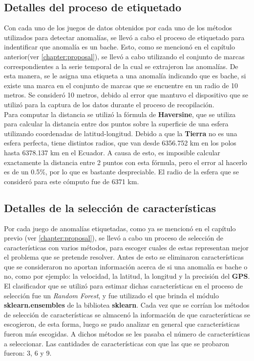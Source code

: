 	\subsection{Detalles del proceso de etiquetado}
		Con cada uno de los juegos de datos obtenidos por cada uno de los métodos utilizados para detectar anomalías, se llevó a cabo
		el proceso de etiquetado para indentificar que anomalía es un bache. Esto, como se mencionó en el capítulo anterior(ver \ref{chapter:proposal}),
		se llevó a cabo utilizando el conjunto de marcas correspondientes a la serie temporal de la cual se extrajeron las anomalías. De esta manera, se
		le asigna una etiqueta a una anomalía indicando que es bache, si existe una marca en el conjunto de marcas que se encuentre en un radio de 10
		metros. Se consideró 10 metros, debido al error que mantuvo el dispositivo que se utilizó para la captura de los datos durante el proceso de
		recopilación.\\
		\indent Para computar la distancia se utilizó la fórmula de \textbf{Haversine}, que se utiliza para calcular la distancia entre dos puntos sobre la
		superficie de una esfera utilizando coordenadas de latitud-longitud. Debido a que la \textbf{Tierra} no es una esfera perfecta, tiene distintos radios, que
		van desde 6356.752 km en los polos hasta 6378.137 km en el Ecuador. A causa de esto, es imposible calcular exactamente la distancia entre 2 puntos
		con esta fórmula, pero el error al hacerlo es de un 0.5\%, por lo que es bastante despreciable. El radio de la esfera que se consideró para este
		cómputo fue de 6371 km.\\

	\subsection{Detalles de la selección de características}
		Por cada juego de anomalías etiquetadas, como ya se mencionó en el capítulo previo (ver \ref{chapter:proposal}), se llevó a cabo un proceso
		de selección de características con varios métodos, para escoger cuales de estas representan mejor el problema que se pretende resolver.
		Antes de esto se eliminaron características que se consideraron no aportan información acerca de si una anomalía es bache o no, como por ejemplo:
		la velocidad, la latitud, la longitud y la precisión del \textbf{GPS}.\\
		\indent El clasificador que se utilizó para estimar dichas características en el proceso de selección fue un \emph{Random Forest}, y fue
		utilizado el que brinda el módulo \textbf{sklearn.ensembles} de la bibliotea \textbf{sklearn}. Cada vez que se corrían los métodos de selección
		de características se almacenó la información de que características se escogieron, de esta forma, luego se pudo analizar en general que
		características fueron más escogidas. A dichos métodos se les pasaba el número de características a seleccionar. Las cantidades de características
		con que las que se probaron fueron: 3, 6 y 9.\\

